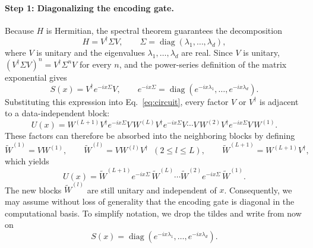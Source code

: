 \documentclass[12pt]{article}
\numberwithin{equation}{section}  %
\begin{document}
\paragraph{Step 1: Diagonalizing the encoding gate.} Because $H$ is Hermitian, the spectral theorem guarantees the decomposition
\begin{equation}
H = V^{\dagger} \Sigma V, \qquad
\Sigma = \operatorname{diag}(\lambda_1, \ldots, \lambda_d),
\end{equation}
where $V$ is unitary and the eigenvalues $\lambda_1, \ldots, \lambda_d$ are real. Since $V$ is unitary, $(V^{\dagger}\Sigma V)^n = V^{\dagger}\Sigma^n V$ for every $n$, and the power-series definition of the matrix exponential gives
\begin{equation}
S(x) = V^{\dagger} e^{-ix\Sigma} V, \qquad
e^{-ix\Sigma} = \operatorname{diag}\!\left(e^{-ix\lambda_1}, \ldots, e^{-ix\lambda_d}\right).
\end{equation}
Substituting this expression into Eq.~\eqref{eq:circuit}, every factor $V$ or $V^{\dagger}$ is adjacent to a data-independent block:
\begin{equation}
U(x) = W^{(L+1)} V^{\dagger} e^{-ix\Sigma} V\, W^{(L)} V^{\dagger} e^{-ix\Sigma} V \cdots V\, W^{(2)} V^{\dagger} e^{-ix\Sigma} V\, W^{(1)}.
\end{equation}
These factors can therefore be absorbed into the neighboring blocks by defining
\begin{equation}
\widetilde{W}^{(1)} = V W^{(1)}, \qquad
\widetilde{W}^{(l)} = V W^{(l)} V^{\dagger} \;\; (2 \le l \le L), \qquad
\widetilde{W}^{(L+1)} = W^{(L+1)} V^{\dagger},
\end{equation}
which yields
\begin{equation}
U(x) = \widetilde{W}^{(L+1)} e^{-ix\Sigma}\, \widetilde{W}^{(L)} \cdots \widetilde{W}^{(2)} e^{-ix\Sigma}\, \widetilde{W}^{(1)}.
\end{equation}
The new blocks $\widetilde{W}^{(l)}$ are still unitary and independent of $x$. Consequently, we may assume without loss of generality that the encoding gate is diagonal in the computational basis. To simplify notation, we drop the tildes and write from now on
\begin{equation}
S(x) = \operatorname{diag}\!\left(e^{-ix\lambda_1}, \ldots, e^{-ix\lambda_d}\right).
\label{eq:diag_encoding}
\end{equation}
\end{document}
